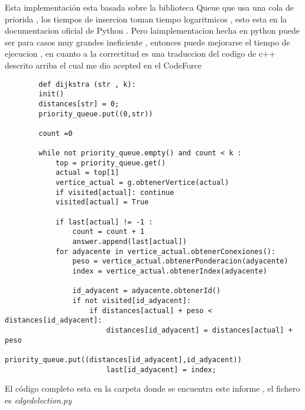 \documentclass[10pt]{article}
\begin{document}
    \noindent Esta implementaci\'on esta basada sobre la biblioteca Queue que usa una cola de priorida , los tiempos de insercion toman tiempo logaritmicos , esto esta en la documentacion oficial de Python   . Pero laimplementacion hecha en python puede ser para casos muy  grandes ineficiente  , entonces  puede mejorarse el tiempo de ejecucion   , en cuanto a la correctitud es una traduccion del codigo de c++ descrito arriba el cual me dio acepted en el CodeForce 
    \begin{verbatim}
        def dijkstra (str , k):
        init()
        distances[str] = 0; 
        priority_queue.put((0,str))

        count =0 

        while not priority_queue.empty() and count < k :
            top = priority_queue.get()
            actual = top[1]
            vertice_actual = g.obtenerVertice(actual)
            if visited[actual]: continue 
            visited[actual] = True

            if last[actual] != -1 :
                count = count + 1
                answer.append(last[actual]) 
            for adyacente in vertice_actual.obtenerConexiones():
                peso = vertice_actual.obtenerPonderacion(adyacente)
                index = vertice_actual.obtenerIndex(adyacente) 

                id_adyacent = adyacente.obtenerId()
                if not visited[id_adyacent]:
                    if distances[actual] + peso < distances[id_adyacent]:
                        distances[id_adyacent] = distances[actual] + peso 
                        priority_queue.put((distances[id_adyacent],id_adyacent))
                        last[id_adyacent] = index;  
    \end{verbatim}

    \noindent El c\'odigo completo esta en la carpeta donde se encuentra este informe , el fichero es \textit{edgedelection.py} 
\end{document}
